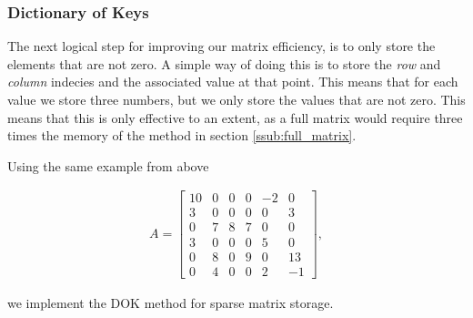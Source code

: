 \documentclass[../fem.tex]{subfiles}
\begin{document}
\begin{Figure}
  \begin{center}
  \end{center}
  \label{fig:mat_full}
\end{Figure}

\subsubsection{Dictionary of Keys}%
\label{ssub:dictionary_of_keys}

The next logical step for improving our matrix efficiency, is to only store the
elements that are not zero. A simple way of doing this is to store the
\textit{row} and \textit{column} indecies and the associated value at that
point. This means that for each value we store three numbers, but we only store
the values that are not zero. This means that this is only effective to an
extent, as a full matrix would require three times the memory of the method in
section \ref{ssub:full_matrix}.

Using the same example from above

\begin{align*}
   A = \begin{bmatrix}
     10 & 0 & 0 & 0 & -2 & 0 \\
     3 & 0 & 0 & 0 & 0 & 3 \\
     0 & 7 & 8 & 7 & 0 & 0 \\
     3 & 0 & 0 & 0 & 5 & 0 \\
     0 & 8 & 0 & 9 & 0 & 13 \\
     0 & 4 & 0 & 0 & 2 & -1
   \end{bmatrix},
\end{align*}

we implement the DOK method for sparse matrix storage.
\end{document}
